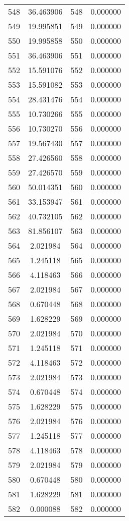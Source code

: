\documentclass[12pt]{article}
\begin{document}
\begin{longtable}{@{}cccc@{}}
548 & 36.463906 & 548 & 0.000000 \\
549 & 19.995851 & 549 & 0.000000 \\
550 & 19.995858 & 550 & 0.000000 \\
551 & 36.463906 & 551 & 0.000000 \\
552 & 15.591076 & 552 & 0.000000 \\
553 & 15.591082 & 553 & 0.000000 \\
554 & 28.431476 & 554 & 0.000000 \\
555 & 10.730266 & 555 & 0.000000 \\
556 & 10.730270 & 556 & 0.000000 \\
557 & 19.567430 & 557 & 0.000000 \\
558 & 27.426560 & 558 & 0.000000 \\
559 & 27.426570 & 559 & 0.000000 \\
560 & 50.014351 & 560 & 0.000000 \\
561 & 33.153947 & 561 & 0.000000 \\
562 & 40.732105 & 562 & 0.000000 \\
563 & 81.856107 & 563 & 0.000000 \\
564 & 2.021984 & 564 & 0.000000 \\
565 & 1.245118 & 565 & 0.000000 \\
566 & 4.118463 & 566 & 0.000000 \\
567 & 2.021984 & 567 & 0.000000 \\
568 & 0.670448 & 568 & 0.000000 \\
569 & 1.628229 & 569 & 0.000000 \\
570 & 2.021984 & 570 & 0.000000 \\
571 & 1.245118 & 571 & 0.000000 \\
572 & 4.118463 & 572 & 0.000000 \\
573 & 2.021984 & 573 & 0.000000 \\
574 & 0.670448 & 574 & 0.000000 \\
575 & 1.628229 & 575 & 0.000000 \\
576 & 2.021984 & 576 & 0.000000 \\
577 & 1.245118 & 577 & 0.000000 \\
578 & 4.118463 & 578 & 0.000000 \\
579 & 2.021984 & 579 & 0.000000 \\
580 & 0.670448 & 580 & 0.000000 \\
581 & 1.628229 & 581 & 0.000000 \\
582 & 0.000088 & 582 & 0.000000 \\

\end{longtable}
\end{document}
